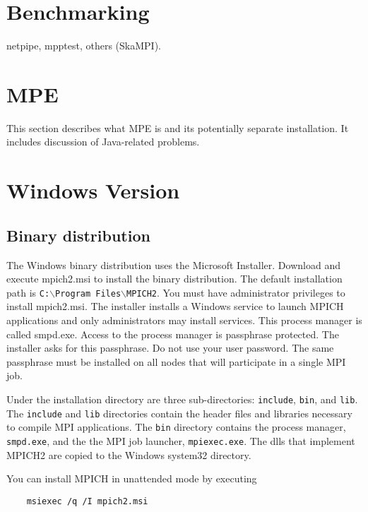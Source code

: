 \documentclass[dvipdfm,11pt]{article}
\begin{document}
\section{Benchmarking}
\label{sec:benchmarking}
netpipe, mpptest, others (SkaMPI).

\section{MPE}
\label{sec:mpe}

This section describes what MPE is and its potentially separate installation.  It
includes discussion of Java-related problems.

\section{Windows Version}
\label{sec:windows}

\subsection{Binary distribution}
\label{sec:winbin}

The Windows binary distribution uses the Microsoft Installer.  Download and 
execute mpich2.msi to install the binary distribution.  The default 
installation path is \texttt{C:$\backslash$Program Files$\backslash$MPICH2}. 
You must have administrator privileges to install mpich2.msi.  The installer 
installs a Windows service to launch MPICH applications and only administrators
may install services.  This process manager is called smpd.exe.  Access to 
the process manager is passphrase protected.  The installer asks for this 
passphrase.  Do not use your user password.  The same passphrase must be 
installed on all nodes that will participate in a single MPI job.

Under the installation directory are three sub-directories: \texttt{include},
 \texttt{bin}, and \texttt{lib}.  The \texttt{include} and \texttt{lib} 
directories contain the header files and libraries necessary to compile MPI 
applications.  The \texttt{bin} directory contains the process manager, 
\texttt{smpd.exe}, and the the MPI job launcher, \texttt{mpiexec.exe}.  The
dlls that implement MPICH2 are copied to the Windows system32 directory.

You can install MPICH in unattended mode by executing 
\begin{verbatim}
    msiexec /q /I mpich2.msi
\end{verbatim}
\end{document}
